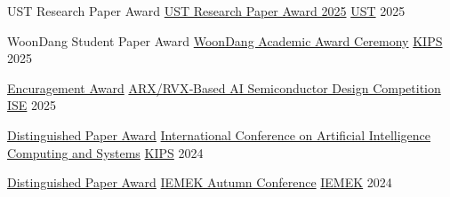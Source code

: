 


\begin{cvhonors}
  \cvhonor
    {UST Research Paper Award}
    {\href{https://www.ust.ac.kr/kor/sub03_08_01.do}
    {UST Research Paper Award 2025}
    }
    {\href{https://www.ust.ac.kr}
    {UST}
    }
    {2025}
  
  \cvhonor
    {WoonDang Student Paper Award}
    {\href{https://kips.or.kr/awards}{WoonDang Academic Award Ceremony}} %
    {\href{https://www.kips.or.kr}{KIPS}} %
    {2025} %

  \cvhonor
    {\href{https://drive.google.com/file/d/1a-sDRsTJjRzY7uqvr_VzDb9T9_vP40Ye}
    {Encuragement Award}} %
    {\href{https://www.hellot.net/news/article.html?no=103422}
    {ARX/RVX‑Based AI Semiconductor Design Competition}} %
    {\href{https://www.theise.org}{ISE}} %
    {2025} %

  \cvhonor
    {\href{https://drive.google.com/file/d/1qN4yOGgYGcgql7G2jwNIT_S3KRXfIqnV}
    {Distinguished Paper Award}} %
    {\href{https://aicomps.kips.or.kr}
    {International Conference on Artificial Intelligence Computing and Systems}} %
    {\href{https://www.kips.or.kr/}{KIPS}} %
    {2024} %

  \cvhonor
    {\href{https://drive.google.com/file/d/1fSCLQoxdnSPsSzEDSVpwNe4-INuBKy2b}
    {Distinguished Paper Award}} %
    {\href{https://iemek.org/Conference/ConferenceView.asp?top_param=&sub_param=&AC=0&CODE=CC20240802&CpPage=606}
    {IEMEK Autumn Conference}} %
    {\href{https://iemek.org}{IEMEK}} %
    {2024} %



\end{cvhonors}
